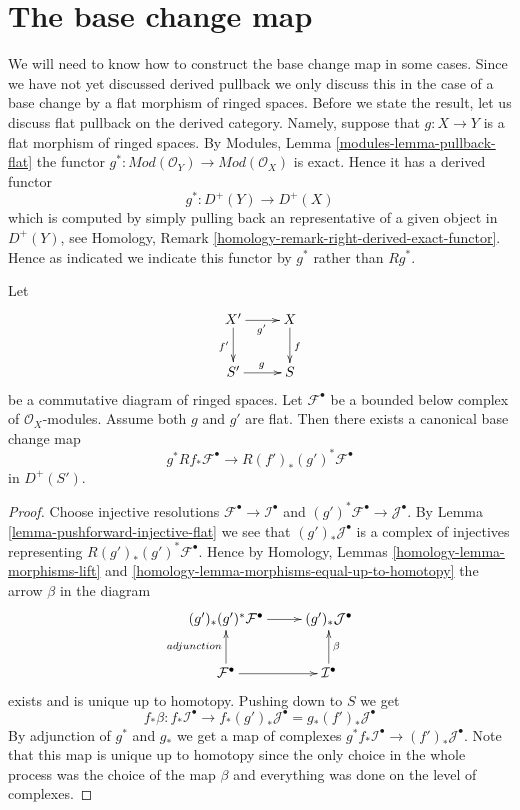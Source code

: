 \section{The base change map}
\label{section-base-change-map}

\noindent
We will need to know how to construct the base change map in some cases.
Since we have not yet discussed derived pullback we only discuss
this in the case of a base change by a flat morphism of ringed spaces.
Before we state the result, let us discuss flat pullback on the derived
category. Namely, suppose that $g : X \to Y$ is a flat morphism of
ringed spaces. By Modules, Lemma \ref{modules-lemma-pullback-flat}
the functor $g^* : \textit{Mod}(\mathcal{O}_Y) \to
\textit{Mod}(\mathcal{O}_X)$ is exact. Hence it has a derived functor
$$
g^* : D^{+}(Y) \to D^{+}(X)
$$
which is computed by simply pulling back an representative of a given
object in $D^{+}(Y)$, see
Homology, Remark \ref{homology-remark-right-derived-exact-functor}.
Hence as indicated we indicate this functor by $g^*$ rather than
$Rg^*$.

\begin{lemma}
\label{lemma-base-change-map-flat-case}
Let
$$
\xymatrix{
X' \ar[r]_{g'} \ar[d]_{f'} &
X \ar[d]^f \\
S' \ar[r]^g &
S
}
$$
be a commutative diagram of ringed spaces.
Let $\mathcal{F}^\bullet$ be a bounded below complex of
$\mathcal{O}_X$-modules.
Assume both $g$ and $g'$ are flat.
Then there exists a canonical base change map
$$
g^*Rf_*\mathcal{F}^\bullet
\longrightarrow
R(f')_*(g')^*\mathcal{F}^\bullet
$$
in $D^{+}(S')$.
\end{lemma}

\begin{proof}
Choose injective resolutions $\mathcal{F}^\bullet \to \mathcal{I}^\bullet$
and $(g')^*\mathcal{F}^\bullet \to \mathcal{J}^\bullet$.
By Lemma \ref{lemma-pushforward-injective-flat} we see that
$(g')_*\mathcal{J}^\bullet$ is a complex of injectives representing
$R(g')_*(g')^*\mathcal{F}^\bullet$. Hence by
Homology, Lemmas \ref{homology-lemma-morphisms-lift}
and \ref{homology-lemma-morphisms-equal-up-to-homotopy}
the arrow $\beta$ in the diagram
$$
\xymatrix{
(g')_*(g')^*\mathcal{F}^\bullet \ar[r] &
(g')_*\mathcal{J}^\bullet \\
\mathcal{F}^\bullet \ar[u]^{adjunction} \ar[r] &
\mathcal{I}^\bullet \ar[u]_\beta
}
$$
exists and is unique up to homotopy.
Pushing down to $S$ we get
$$
f_*\beta :
f_*\mathcal{I}^\bullet
\longrightarrow
f_*(g')_*\mathcal{J}^\bullet
=
g_*(f')_*\mathcal{J}^\bullet
$$
By adjunction of $g^*$ and $g_*$ we get a map of complexes
$g^*f_*\mathcal{I}^\bullet \to (f')_*\mathcal{J}^\bullet$.
Note that this map is unique up to homotopy since the only
choice in the whole process was the choice of the map $\beta$
and everything was done on the level of complexes.
\end{proof}

